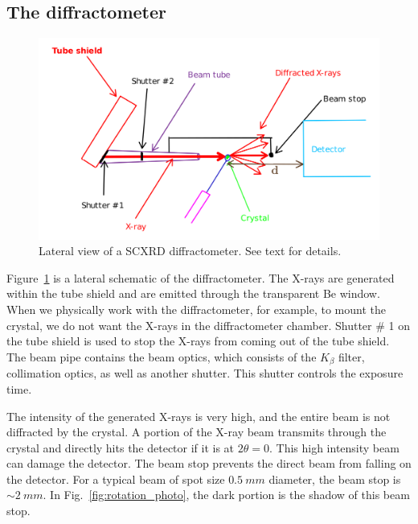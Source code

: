 \subsection{The diffractometer}

\begin{figure}
	\centering
	\includegraphics[scale=0.15]{sc_diffractometer_lateral.png}
	\caption{\label{diffractometer_lateral}Lateral view of a SCXRD diffractometer. See text for details.}
\end{figure}

Figure~\ref{diffractometer_lateral} is a lateral schematic of the diffractometer. The X-rays are generated within the tube shield and are emitted through the transparent Be window. When we physically work with the diffractometer, for example, to mount the crystal, we do not want the X-rays in the diffractometer chamber. Shutter \# 1 on the tube shield is used to stop the X-rays from coming out of the tube shield. The beam pipe contains the beam optics, which consists of the $K_\beta$ filter, collimation optics, as well as another shutter. This shutter controls the exposure time.

The intensity of the generated X-rays is very high, and the entire beam is not diffracted by the crystal. A portion of the X-ray beam transmits through the crystal and directly hits the detector if it is at $2\theta = 0.$ This high intensity beam can damage the detector. The beam stop prevents the direct beam from falling on the detector. For a typical beam of spot size $\SI{0.5}{mm}$ diameter, the beam stop is $\sim \SI{2}{mm}.$ In Fig.~\ref{fig:rotation_photo}, the dark portion is the shadow of this beam stop.

